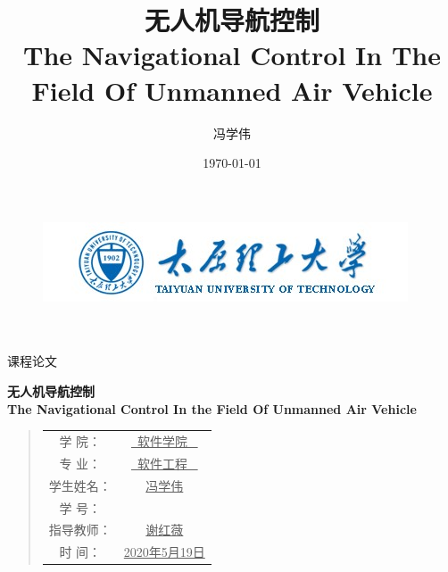 \documentclass[UTF8,a4paper,10pt,nocolorlinks]{ctexart}
\title{
    \huge{\textbf{无人机导航控制}}\\
    \Large{\textbf{The Navigational Control In The Field Of Unmanned Air Vehicle}}
}
\author{冯学伟}
\date{\today}
\DeclareRobustCommand{\sanhao}{\fontsize{16pt}{\baselineskip}\selectfont}  %
\begin{document}
    \begin{figure}[t]
		\parbox[b]{2cm}{
			\includegraphics[width=\textwidth]{TYUT.jpg}
			}
	\end{figure}

	\begin{center}
		\quad \\
		\quad \\
		\heiti \fontsize{45}{17} 课\quad 程\quad 论\quad 文
		\vskip 3.5cm	
        \begin{center} %
            \huge{\textbf{无人机导航控制}}\\[3mm]
            \Large{\textbf{The Navigational Control In the Field Of Unmanned Air Vehicle}}\\[1mm]
        \end{center}
	\end{center}
    \vskip 3.5cm
    
    \begin{quotation}
        \begin{center}
            \begin{flushleft}
            \songti \fontsize{15}{15}
            \doublespacing
            \par\setlength\parindent{12em}
            \quad 
            \sanhao 
            \centering
            \begin{tabular}{cc}
                学\hspace{1.2cm}  院：&\underline{\qquad\  软件学院 \ \qquad}\\
                专\hspace{1.2cm}  业：&\underline{\qquad\  软件工程 \ \qquad}\\
                学生姓名：&\underline{\qquad\quad 冯学伟 \quad\qquad}\\
                学\hspace{1cm} 号：&\underline{\quad\quad 2019520941 \quad\quad}\\
                指导教师：&\underline{\qquad\quad 谢红薇  \quad\qquad}\\
                时\hspace{1cm} 间：&\underline{\quad2020年5月19日\qquad}\\
            \end{tabular}
            \vskip 2cm
            \centering
            \end{flushleft}
        \end{center}
	\end{quotation}
    \thispagestyle{empty} %
    \clearpage
\end{document}

